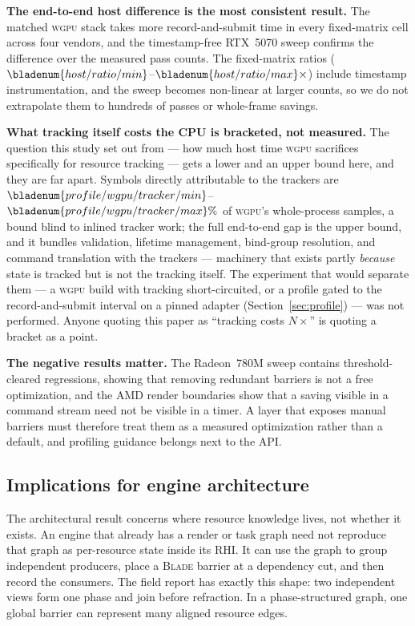 \documentclass[10pt,twocolumn]{article}
\newcommand{\blade}{\textsc{Blade}}
\newcommand{\wgpu}{\textsc{wgpu}}
\begin{document}
\textbf{The end-to-end host difference is the most consistent result.} The
matched \wgpu{} stack takes more record-and-submit time in every fixed-matrix
cell across four vendors, and the timestamp-free RTX~5070 sweep confirms the
difference over the measured pass counts. The fixed-matrix ratios
($\bladenum{host/ratio/min}$--$\bladenum{host/ratio/max}\times$) include
timestamp instrumentation, and the sweep becomes non-linear at larger counts,
so we do not extrapolate them to hundreds of passes or whole-frame savings.

\textbf{What tracking itself costs the CPU is bracketed, not measured.} The
question this study set out from --- how much host time \wgpu{} sacrifices
specifically for resource tracking --- gets a lower and an upper bound here,
and they are far apart. Symbols directly attributable to the trackers are
$\bladenum{profile/wgpu/tracker/min}$--$\bladenum{profile/wgpu/tracker/max}\%$
of \wgpu's whole-process samples, a bound blind to inlined tracker work; the
full end-to-end gap is the upper bound, and it bundles validation, lifetime
management, bind-group resolution, and command translation with the
trackers --- machinery that exists partly \emph{because} state is tracked but
is not the tracking itself. The experiment that would separate them --- a
\wgpu{} build with tracking short-circuited, or a profile gated to the
record-and-submit interval on a pinned adapter
(Section~\ref{sec:profile}) --- was not performed. Anyone quoting this paper
as ``tracking costs $N\times$'' is quoting a bracket as a point.

\textbf{The negative results matter.} The Radeon~780M sweep contains
threshold-cleared regressions, showing that removing redundant barriers is not
a free optimization, and the AMD render boundaries show that a saving visible
in a command stream need not be visible in a timer. A layer that exposes
manual barriers must therefore treat them as a measured optimization rather
than a default, and profiling guidance belongs next to the API.

\subsection{Implications for engine architecture}
\label{sec:engine-implications}

The architectural result concerns where resource knowledge lives, not whether
it exists. An engine that already has a render or task graph need not reproduce
that graph as per-resource state inside its RHI. It can use the graph to group
independent producers, place a \blade{} barrier at a dependency cut, and then
record the consumers. The field report has exactly this shape: two independent
views form one phase and join before refraction. In a phase-structured graph,
one global barrier can represent many aligned resource edges.
\end{document}
